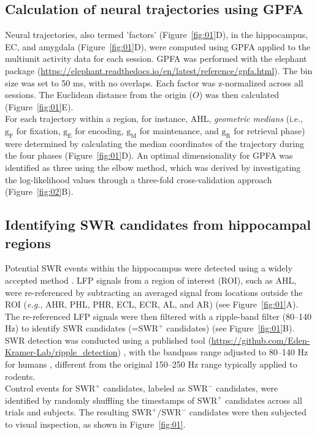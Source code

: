 \documentclass[final,3p,times,twocolumn]{elsarticle}
\begin{document}
\subsection{Calculation of neural trajectories using GPFA}
Neural trajectories, also termed 'factors' (Figure~\ref{fig:01}D), in the hippocampus, EC, and amygdala (Figure~\ref{fig:01}D), were computed using GPFA \cite{yu_gaussian-process_2009} applied to the multiunit activity data for each session. GPFA was performed with the elephant package (\url{https://elephant.readthedocs.io/en/latest/reference/gpfa.html}). The bin size was set to 50 ms, with no overlaps. Each factor was z-normalized across all sessions. The Euclidean distance from the origin ($O$) was then calculated (Figure~\ref{fig:01}E).
\\
\indent
For each trajectory within a region, for instance, AHL, \textit{geometric medians} (i.e., $\mathrm{g_{F}}$ for fixation, $\mathrm{g_{E}}$ for encoding, $\mathrm{g_{M}}$ for maintenance, and $\mathrm{g_{R}}$ for retrieval phase) were determined by calculating the median coordinates of the trajectory during the four phases (Figure~\ref{fig:01}D). An optimal dimensionality for GPFA was identified as three using the elbow method, which was derived by investigating the log-likelihood values through a three-fold cross-validation approach (Figure~\ref{fig:02}B).

\subsection{Identifying SWR candidates from hippocampal regions}
Potential SWR events within the hippocampus were detected using a widely accepted method \cite{liu_consensus_2022}. LFP signals from a region of interest (ROI), such as AHL, were re-referenced by subtracting an averaged signal from locations outside the ROI (\textit{e.g.}, AHR, PHL, PHR, ECL, ECR, AL, and AR) (see Figure~\ref{fig:01}A). The re-referenced LFP signals were then filtered with a ripple-band filter (80--140 Hz) to identify SWR candidates (=$\textrm{SWR}^+$ candidates) (see Figure~\ref{fig:01}B). SWR detection was conducted using a published tool (\url{https://github.com/Eden-Kramer-Lab/ripple_detection}) \cite{kay_hippocampal_2016}, with the bandpass range adjusted to 80--140 Hz for humans \cite{norman_hippocampal_2019} \cite{norman_hippocampal_2021}, different from the original 150--250 Hz range typically applied to rodents.
\\
\indent
Control events for $\textrm{SWR}^+$ candidates, labeled as $\textrm{SWR}^-$ candidates, were identified by randomly shuffling the timestamps of $\textrm{SWR}^+$ candidates across all trials and subjects. The resulting $\textrm{SWR}^+/\textrm{SWR}^-$ candidates were then subjected to visual inspection, as shown in Figure~\ref{fig:01}.
\end{document}

